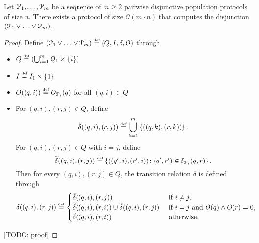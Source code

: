 \begin{lemma}
	 Let $\mathcal{P}_1, \ldots, \mathcal{P}_m$ be a sequence of $m \geq 2$  
	pairwise disjunctive population protocols of size $n$.
	There exists a protocol of size 
	$\mathcal{O}\left(m \cdot  n \right)$ that computes the 
	disjunction $(\mathcal{P}_1 \lor \ldots \lor \mathcal{P}_m)$.
\end{lemma}
\begin{proof}
	Define $(\mathcal{P}_1 \lor \ldots \lor \mathcal{P}_m) \stackrel{\scriptscriptstyle\text{def}}{=} (Q, I, \delta, O)$ through 
	\begin{itemize}
		\item $Q \stackrel{\scriptscriptstyle\text{def}}{=} \left(\bigcup_{i=1}^m Q_1 \times \left\{i\right\}\right)$
		\item $I \stackrel{\scriptscriptstyle\text{def}}{=} I_1 \times \left\{1\right\}$
		\item $O((q, i)) \stackrel{\scriptscriptstyle\text{def}}{=} O_{\mathcal{P}_i}(q)$ for all $(q, i) \in Q$
		\item For $(q, i), (r, j) \in Q$, define 
			  $$\hat{\delta}((q, i), (r, j)) \stackrel{\scriptscriptstyle\text{def}}{=} \bigcup_{k=1}^m 
			  \left\{((q, k), (r, k))\right\}.$$
			  For $(q, i), (r, j) \in Q$ with $i = j$, define 
			  $$\widetilde{\delta}((q, i), (r, j)) \stackrel{\scriptscriptstyle\text{def}}{=} \left\{((q', i), (r', i)) 
			  \colon (q', r') \in \delta_{\mathcal{P}_i}(q, r)\right\}.$$
			  Then for every $(q, i), (r, j) \in Q$, the transition relation 
			  $\delta$ is defined through
			  $$
			  \delta((q, i), (r, j)) \stackrel{\scriptscriptstyle\text{def}}{=} 
			  \begin{cases}
			  	\hat{\delta}((q, i), (r, j)) & \text{ if } i \neq j, \\
			  	\widetilde{\delta}((q, i), (r, i)) \cup \hat{\delta}((q, i), (r, j)) & 
			  	\text{ if } i = j \text{ and } O(q) \land O(r) = 0, \\
			  	\widetilde{\delta}((q, i), (r, i)) & \text{ otherwise.}
			  \end{cases}
			  $$
	\end{itemize}
	[TODO: proof]
\end{proof} 